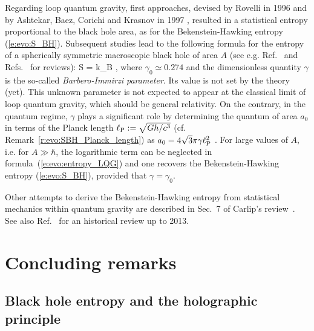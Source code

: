 Regarding loop quantum gravity, first approaches, devised by Rovelli in 1996 \cite{Rovel96}
and by Ashtekar, Baez, Corichi and Krasnov in 1997 \cite{AshteBCK98},
resulted in a statistical entropy proportional to the black hole area,
as for the Bekenstein-Hawking entropy (\ref{e:evo:S_BH}). Subsequent studies
lead to the following
formula for the entropy of a spherically symmetric macroscopic black hole of area $A$
(see e.g. Ref.~\cite{EngleNP10} and Refs.~\cite{BarbeP23,Carli14,Perez17} for reviews):
\be \label{e:evo:entropy_LQG}
    S = k_{\rm B}  ,
\ee
where $\gamma_0 \simeq 0.274$ and the dimensionless quantity $\gamma$ is the so-called
\emph{Barbero-Immirzi parameter}.
Its value is not set by the theory (yet). This unknown parameter
is not expected to appear at the classical limit of
loop quantum gravity, which should be general relativity.
On the contrary, in the quantum regime, $\gamma$ plays a significant role
by determining the quantum of area $a_0$ in terms of
the Planck length $\ell_{\rm P} := \sqrt{Gh/c^3}$ (cf. Remark~\ref{r:evo:SBH_Planck_length}) as
$a_0 = 4\sqrt{3}\pi \gamma \ell_{\rm P}^2$ \cite{Rovel04}.
For large values of $A$, i.e.  for $A\gg \hbar$,
the logarithmic term can be neglected in formula~(\ref{e:evo:entropy_LQG}) and one recovers the
Bekenstein-Hawking entropy (\ref{e:evo:S_BH}), provided that $\gamma = \gamma_0$.

Other attempts to derive the Bekenstein-Hawking entropy from statistical mechanics
within quantum gravity are described in Sec.~7 of Carlip's review~\cite{Carli14}.
See also Ref.~\cite{GrumiMS15} for an historical review up to 2013.


\section{Concluding remarks}

\subsection{Black hole entropy and the holographic principle}

